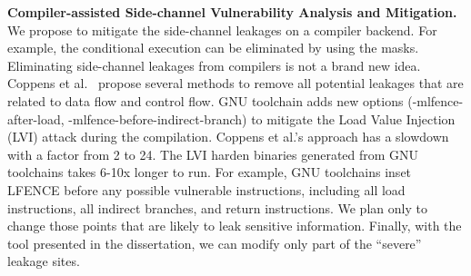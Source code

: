 \textbf{Compiler-assisted Side-channel Vulnerability Analysis and Mitigation.}
We propose to mitigate the side-channel leakages on a compiler backend. For example, the conditional execution can be eliminated by using the masks. Eliminating side-channel leakages from compilers is not a brand new idea. Coppens et al.~\cite{Coppens:2009:PMT:1607723.1608124} propose several methods to remove all potential leakages that are related to data flow and control flow.  GNU toolchain adds new options (\textsf{-mlfence-after-load}, \textsf{-mlfence-before-indirect-branch}) to mitigate the Load Value Injection (LVI) attack during the compilation. Coppens et al.'s approach has a slowdown with a factor from 2 to 24. The LVI harden binaries generated from GNU toolchains takes 6-10x longer to run.  For example, GNU toolchains inset LFENCE before any possible vulnerable instructions, including all load instructions, all indirect branches, and return instructions. We plan only to change those points that are likely to leak sensitive information. Finally, with the tool presented in the dissertation, we can modify only part of the ``severe'' leakage sites.